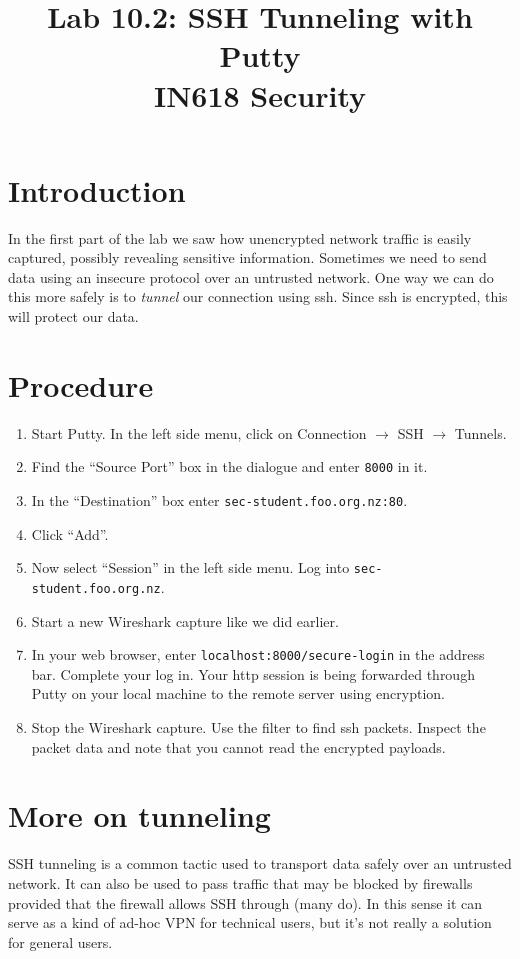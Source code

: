 \documentclass{article}
\begin{document}
\title{ Lab 10.2: SSH Tunneling with Putty  \\ IN618 Security}
\maketitle

\section*{Introduction}
In the first part of the lab we saw how unencrypted network traffic is easily captured, possibly revealing sensitive information. Sometimes we need to send data using an insecure protocol over an untrusted network.  One way we can do this more safely is to \emph{tunnel} our connection using ssh.  Since ssh is encrypted, this will protect our data.


\section{Procedure}
\begin{enumerate}
	\item Start Putty. In the left side menu, click on Connection $\rightarrow$ SSH $\rightarrow$ Tunnels.
	\item Find the ``Source Port'' box in the dialogue and enter \texttt{8000} in it.
	\item In the ``Destination'' box enter \texttt{sec-student.foo.org.nz:80}.
	\item Click ``Add''.
	\item Now select ``Session'' in the left side menu.  Log into \texttt{sec-student.foo.org.nz}.
	\item Start a new Wireshark capture like we did earlier.
	\item In your web browser, enter \texttt{localhost:8000/secure-login} in the address bar.  Complete your log in. Your http session is being forwarded through Putty on your local machine to the remote server using encryption.
	\item Stop the Wireshark capture.  Use the filter to find ssh packets.  Inspect the packet data and note that you cannot read the encrypted payloads.
\end{enumerate}


\section{More on tunneling}
SSH tunneling is a common tactic used to transport data safely over an untrusted network.  It can also be used to pass traffic that may be blocked by firewalls provided that the firewall allows SSH through (many do).  In this sense it can serve as a kind of ad-hoc VPN for technical users, but it's not really a solution for general users.
\end{document}
